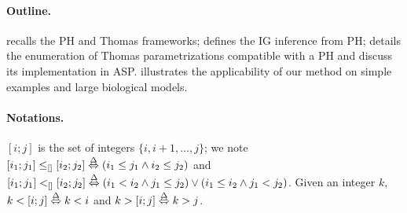 \paragraph{Outline.}
 recalls the PH and Thomas frameworks;
 defines the IG inference from PH;
 details the enumeration of Thomas parametrizations compatible with a PH
and discuss its implementation in ASP.
 illustrates the applicability of our method on simple examples
and large biological models.

\paragraph{Notations.}
$[i;j]$ is the set of integers $\{ i, i+1, \dots, j \}$;
we note $[i_1;j_1] \leq_{[]} [i_2;j_2] \stackrel{\Delta}\Leftrightarrow (i_1\leq j_1\wedge i_2\leq j_2)$
and $[i_1;j_1] <_{[]} [i_2;j_2] \stackrel{\Delta}\Leftrightarrow 
(i_1<i_2 \wedge j_1\leq j_2) \vee (i_1\leq i_2\wedge j_1 < j_2)$.
Given an integer $k$, $k<[i;j] \stackrel{\Delta}\Leftrightarrow k <i$ and $k>[i;j]\stackrel{\Delta}\Leftrightarrow k > j$.
